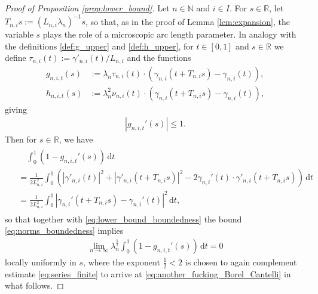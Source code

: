 \documentclass[11pt]{article}
\numberwithin{statement}{section}
\numberwithin{equation}{section}
\theoremstyle{remark}
\newcommand{\R}{\mathbb R} 				%
\newcommand{\N}{\mathbb N}
\newcommand{\intd}{\, \mathrm{d}} 				%
\begin{document}
\begin{proof}[Proof of Proposition \ref{prop:lower_bound}]
	Let $n \in \N$ and $i \in I$.  For $s \in \R$, let
        $T_{n,i} s := (L_{n,i} \lambda_n)^{-1} s$, so that, as in the
        proof of Lemma \ref{lem:expansion}, the variable $s$ plays the
        role of a microscopic arc length parameter.  In analogy with
        the definitions \eqref{def:g_upper} and \eqref{def:h_upper},
        for $t\in [0,1]$ and $s \in \R$ we define
        $\tau_{n,i}(t) := \gamma'_{n,i} (t) / L_{n,i}$ and the
        functions
	\begin{align}
          g_{n,i,t}(s) & := \lambda_n
                         \tau_{n,i}(t) \cdot
                         \left(\gamma_{n,i}(t+ T_{n,i} s ) -
                         \gamma_{n,i}(t )\right), \label{eq:def_g}\\ 
          h_{n,i,t}(s) & := \lambda_n^2 \nu_{n,i}(t) \cdot
                         \left(\gamma_{n,i}(t +T_{n,i} s ) -
                         \gamma_{n,i}(t )\right), \label{eq:def_h}
	\end{align}
        giving
        \begin{align}\label{eq:g_short}
        	|g_{n,i,t}'(s)| \leq 1.
	\end{align}
	Then for $s\in \R$, we have
	\begin{align}
	  \begin{split}
            & \quad  \int_0^1 \left( 1 - g_{n,i,t}'(s) \right) \intd t\\
            & = \frac{1}{2L_{n,i}^2} \int_0^1
            \left(|\gamma'_{n,i}(t)|^2+ |\gamma'_{n,i}(t +
              T_{n,i}s)|^2 - 2\gamma_{n,i}'(t) \cdot \gamma'_{n,i}(t
              + T_{n,i}s )\right) \intd t \\
            & = \frac{1}{2L_{n,i}^2} \int_{0}^1 | \gamma_{n,i}' (t +
            T_{n,i}s) - \gamma_{n,i}' (t)|^2 \intd t,
	  \end{split}
	\end{align}
	so that together with \eqref{eq:lower_bound_boundedness}
        the bound \eqref{eq:norms_boundedness} implies
	\begin{align}\label{eq:gprime}
          \lim_{n \to \infty} \lambda_n^\frac{1}{2}  \int_0^1 \left( 1
          - g_{n,i,t}'(s) \right) \intd t = 0
	\end{align}
	locally uniformly in $s$, where the exponent $\tfrac12 <
          2$ is chosen to again complement estimate
          \eqref{eq:series_finite} to arrive at
          \eqref{eq:another_fucking_Borel_Cantelli} in what follows.


\end{proof}
\end{document}
